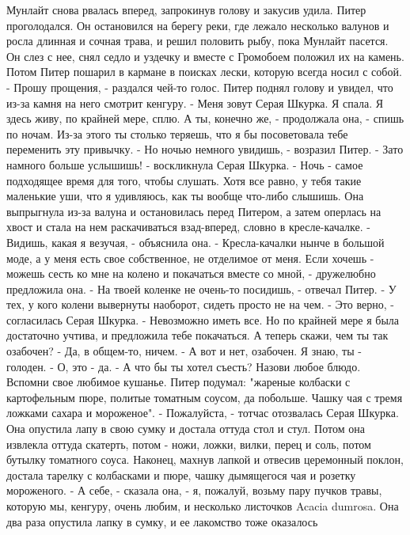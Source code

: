 Мунлайт снова рвалась вперед, запрокинув голову и закусив удила.
    Питер проголодался. Он остановился на берегу реки, где лежало 
несколько валунов и росла длинная и сочная трава, и решил половить 
рыбу, пока Мунлайт пасется. Он слез с нее, снял седло и уздечку и 
вместе с Громобоем положил их на камень. Потом Питер пошарил в кармане 
в поисках лески, которую всегда носил с собой.
    - Прошу прощения, - раздался чей-то голос. Питер поднял голову и 
увидел, что из-за камня на него смотрит кенгуру.
    - Меня зовут Серая Шкурка. Я спала. Я здесь живу, по крайней мере, 
сплю. А ты, конечно же, - продолжала она, - спишь по ночам. Из-за 
этого ты столько теряешь, что я бы посоветовала тебе переменить эту 
привычку.
    - Но ночью немного увидишь, - возразил Питер.
    - Зато намного больше услышишь! - воскликнула Серая Шкурка. - Ночь 
- самое подходящее время для того, чтобы слушать. Хотя все равно, у 
тебя такие маленькие уши, что я удивляюсь, как ты вообще что-либо 
слышишь.
    Она выпрыгнула из-за валуна и остановилась перед Питером, а затем 
оперлась на хвост и стала на нем раскачиваться взад-вперед, словно в 
кресле-качалке.
    - Видишь, какая я везучая, - объяснила она. - Кресла-качалки нынче 
в большой моде, а у меня есть свое собственное, не отделимое от меня. 
Если хочешь - можешь сесть ко мне на колено и покачаться вместе со 
мной, - дружелюбно предложила она.
    - На твоей коленке не очень-то посидишь, - отвечал Питер. - У тех, 
у кого колени вывернуты наоборот, сидеть просто не на чем.
    - Это верно, - согласилась Серая Шкурка. - Невозможно иметь все. 
Но по крайней мере я была достаточно учтива, и предложила тебе 
покачаться. А теперь скажи, чем ты так озабочен?
    - Да, в общем-то, ничем.
    - А вот и нет, озабочен. Я знаю, ты - голоден.
    - О, это - да.
    - А что бы ты хотел съесть? Назови любое блюдо. Вспомни свое 
любимое кушанье.
    Питер подумал: "жареные колбаски с картофельным пюре, политые 
томатным соусом, да побольше. Чашку чая с тремя ложками сахара и 
мороженое".
    - Пожалуйста, - тотчас отозвалась Серая Шкурка. Она опустила лапу 
в свою сумку и достала оттуда стол и стул. Потом она извлекла оттуда 
скатерть, потом - ножи, ложки, вилки, перец и соль, потом бутылку 
томатного соуса. Наконец, махнув лапкой и отвесив церемонный поклон, 
достала тарелку с колбасками и пюре, чашку дымящегося чая и розетку 
мороженого.
    - А себе, - сказала она, - я, пожалуй, возьму пару пучков травы, 
которую мы, кенгуру, очень любим, и несколько листочков Acacia 
dumrosa.
    Она два раза опустила лапку в сумку, и ее лакомство тоже оказалось 
